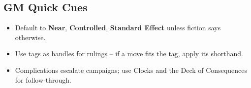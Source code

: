 \subsection{GM Quick Cues}
\begin{itemize}
  \item Default to \textbf{Near}, \textbf{Controlled}, \textbf{Standard Effect} unless fiction says otherwise.
  \item Use tags as handles for rulings -- if a move fits the tag, apply its shorthand.
  \item Complications escalate campaigns; use Clocks and the Deck of Consequences for follow‑through.
\end{itemize}